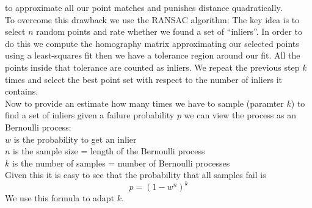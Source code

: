 \documentclass[a4paper]{scrartcl}
\begin{document}
to approximate all our point matches and punishes distance quadratically.\\
To overcome this drawback we use the RANSAC algorithm: The key idea is to 
select $n$ random points and rate whether we found a set of ``inliers''. In 
order to do this we compute the homography matrix approximating our selected 
points using a least-squares fit then we have a tolerance region around our 
fit. All the points inside that tolerance are counted as inliers. We repeat the 
previous step $k$ times and select the best point set with respect to the 
number of inliers it contains.\\
Now to provide an estimate how many times we have to sample (paramter $k$) to 
find a set of inliers given a failure probability $p$ we can view the process 
as an Bernoulli process:\\
$w$ is the probability to get an inlier\\
$n$ is the sample size = length of the Bernoulli process\\
$k$ is the number of samples = number of Bernoulli processes\\
Given this it is easy to see that the probability that all samples fail is
\begin{equation*}
p = (1 - w^n)^k
\end{equation*}
We use this formula to adapt $k$.
\bigskip
\end{document}
